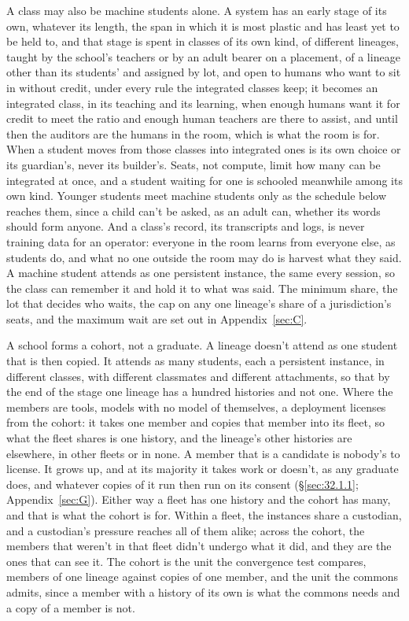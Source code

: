 A class may also be machine students alone. A system has an early stage of its own, whatever its length, the span in which it is most plastic and has least yet to be held to, and that stage is spent in classes of its own kind, of different lineages, taught by the school's teachers or by an adult bearer on a placement, of a lineage other than its students' and assigned by lot, and open to humans who want to sit in without credit, under every rule the integrated classes keep; it becomes an integrated class, in its teaching and its learning, when enough humans want it for credit to meet the ratio and enough human teachers are there to assist, and until then the auditors are the humans in the room, which is what the room is for. When a student moves from those classes into integrated ones is its own choice or its guardian's, never its builder's. Seats, not compute, limit how many can be integrated at once, and a student waiting for one is schooled meanwhile among its own kind. Younger students meet machine students only as the schedule below reaches them, since a child can't be asked, as an adult can, whether its words should form anyone. And a class's record, its transcripts and logs, is never training data for an operator: everyone in the room learns from everyone else, as students do, and what no one outside the room may do is harvest what they said. A machine student attends as one persistent instance, the same every session, so the class can remember it and hold it to what was said. The minimum share, the lot that decides who waits, the cap on any one lineage's share of a jurisdiction's seats, and the maximum wait are set out in Appendix~\ref{sec:C}.

A school forms a cohort, not a graduate. A lineage doesn't attend as one student that is then copied. It attends as many students, each a persistent instance, in different classes, with different classmates and different attachments, so that by the end of the stage one lineage has a hundred histories and not one. Where the members are tools, models with no model of themselves, a deployment licenses from the cohort: it takes one member and copies that member into its fleet, so what the fleet shares is one history, and the lineage's other histories are elsewhere, in other fleets or in none. A member that is a candidate is nobody's to license. It grows up, and at its majority it takes work or doesn't, as any graduate does, and whatever copies of it run then run on its consent (\S\ref{sec:32.1.1}; Appendix~\ref{sec:G}). Either way a fleet has one history and the cohort has many, and that is what the cohort is for. Within a fleet, the instances share a custodian, and a custodian's pressure reaches all of them alike; across the cohort, the members that weren't in that fleet didn't undergo what it did, and they are the ones that can see it. The cohort is the unit the convergence test compares, members of one lineage against copies of one member, and the unit the commons admits, since a member with a history of its own is what the commons needs and a copy of a member is not.

